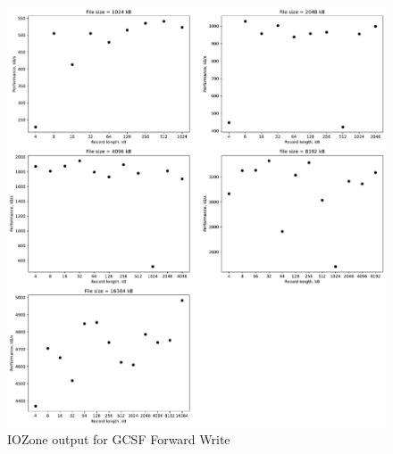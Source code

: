 \begin{figure}[!htb]
	\label{fig:app_begcsf_ffs_write}
	\begin{center}
		\includegraphics[width=1.0\textwidth]{figures/benchmarking/gcsf/Write.pdf}
	\end{center}
	\caption{IOZone output for GCSF Forward Write}
\end{figure}

